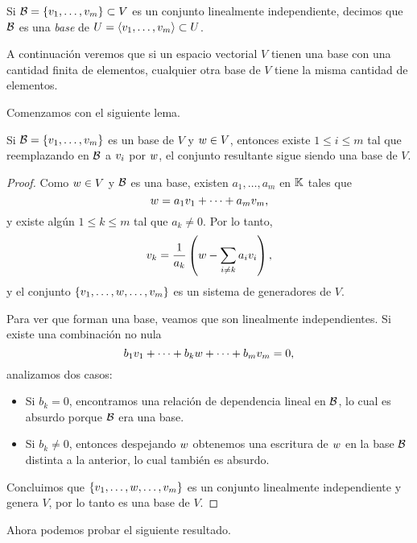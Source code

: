 \begin{definicion}
Si $\B = \{\vb_1, \dots, \vb_m\} \subset V$ es un conjunto linealmente independiente, decimos que $\mathcal B$ es una \emph{base} de $U = \langle \vb_1, \dots, \vb_m \rangle \subset U$.
\end{definicion}

A continuación veremos que si un espacio vectorial $V$ tienen una base con una cantidad finita de elementos, cualquier otra base de $V$ tiene la misma cantidad de elementos.

Comenzamos con el siguiente lema.

\begin{proposicion}
Si $\B = \{\vb_1, \dots, \vb_m\}$ es un base de $V$ y $\wb \in V$, entonces existe $1 \le i \le m$ tal que reemplazando en $\mathcal B$ a $\vb_i$ por $\wb$, el conjunto resultante sigue siendo una base de $V$.
\end{proposicion}

\begin{proof}
Como $\wb \in V$ y $\mathcal B$ es una base, existen $a_1, \dots, a_m$ en $\mathbb K$ tales que
$$ \wb= a_1 \vb_1 + \dots + a_m \vb_m,$$
y existe algún $1 \le k \le m$ tal que $a_k \neq 0$. Por lo tanto,
$$
\vb_k = \frac{1}{a_k}\left( \wb - \sum_{i \neq k} a_i \vb_i\right),
$$
y el conjunto $\{\vb_1, \dots, \wb, \dots, \vb_m\}$ es un sistema de generadores de $V$.

Para ver que forman una base, veamos que son linealmente independientes. Si existe una combinación no nula
$$
b_1 \vb_1 + \dots + b_k \wb + \dots + b_m \vb_m = 0,$$
analizamos dos casos:
\begin{itemize}
\item Si $b_k = 0$, encontramos una relación de dependencia lineal en $\mathcal B$, lo cual es absurdo porque $\mathcal B$ era una base.
\item Si $b_k \neq 0$, entonces despejando $\wb$ obtenemos una escritura de $\wb$ en la base $\mathcal B$ distinta a la anterior, lo cual tambi\'en es absurdo.
\end{itemize}

Concluimos que $\{\vb_1, \dots, \wb, \dots, \vb_m\}$ es un conjunto linealmente independiente y genera $V$, por lo tanto es una base de $V$.
\end{proof}

Ahora podemos probar el siguiente resultado.

